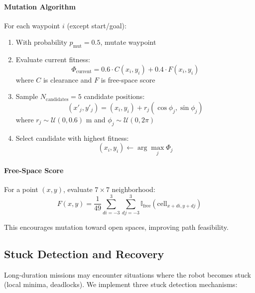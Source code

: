 \paragraph{Mutation Algorithm}
For each waypoint $i$ (except start/goal):
\begin{enumerate}
    \item With probability $p_{\text{mut}} = 0.5$, mutate waypoint
    \item Evaluate current fitness:
    \begin{equation}
    \Phi_{\text{current}} = 0.6 \cdot C(x_i, y_i) + 0.4 \cdot F(x_i, y_i)
    \label{eq:mutation_fitness_current}
    \end{equation}
    where $C$ is clearance and $F$ is free-space score
    \item Sample $N_{\text{candidates}} = 5$ candidate positions:
    \begin{equation}
    (x'_j, y'_j) = (x_i, y_i) + r_j (\cos\phi_j, \sin\phi_j)
    \label{eq:candidate_sampling}
    \end{equation}
    where $r_j \sim \mathcal{U}(0, 0.6)$ m and $\phi_j \sim \mathcal{U}(0, 2\pi)$
    \item Select candidate with highest fitness:
    \begin{equation}
    (x_i, y_i) \leftarrow \arg\max_{j} \Phi_j
    \label{eq:best_candidate}
    \end{equation}
\end{enumerate}

\paragraph{Free-Space Score}
For a point $(x, y)$, evaluate $7 \times 7$ neighborhood:
\begin{equation}
F(x, y) = \frac{1}{49} \sum_{di=-3}^{3} \sum_{dj=-3}^{3} \mathbb{I}_{\text{free}}(\text{cell}_{x+di, y+dj})
\label{eq:free_space_score}
\end{equation}

This encourages mutation toward open spaces, improving path feasibility.

\subsection{Stuck Detection and Recovery}

Long-duration missions may encounter situations where the robot becomes stuck (local minima, deadlocks). We implement three stuck detection mechanisms:

